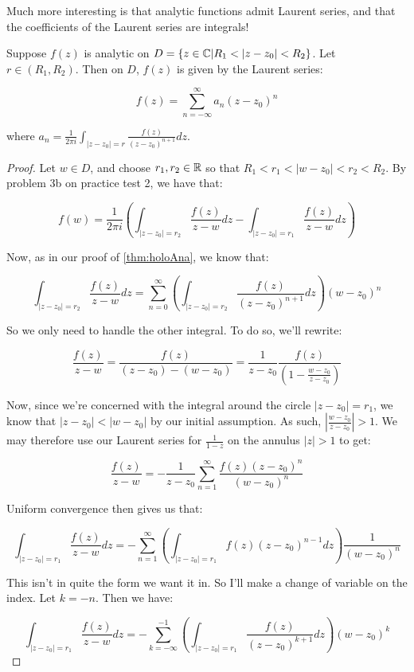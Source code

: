 Much more interesting is that analytic functions admit Laurent series, and that the coefficients of the Laurent series are integrals! 

\begin{thmbo}{}{} Suppose $f(z)$ is analytic on $D = \{z\in\mathbb{C}|R_1 < |z-z_0| < R_2\}$. Let $r\in (R_1,R_2)$. Then on $D$, $f(z)$ is given by the Laurent series:

$$f(z) = \sum_{n = -\infty}^\infty a_n(z-z_0)^n$$

\noin where $a_n = \frac{1}{2\pi i}\int_{|z-z_0|=r} \frac{f(z)}{(z-z_0)^{n+1}}dz$.
\end{thmbo}

\begin{proof} Let $w\in D$, and choose $r_1,r_2 \in \mathbb{R}$ so that $R_1 < r_1 < |w-z_0| < r_2 < R_2$. By problem 3b on practice test 2, we have that:

$$f(w) = \frac{1}{2\pi i}\left(\int_{|z-z_0| = r_2} \frac{f(z)}{z-w}dz - \int_{|z-z_0| = r_1} \frac{f(z)}{z-w}dz\right)$$

Now, as in our proof of \ref{thm:holoAna}, we know that:

$$\int_{|z-z_0| = r_2} \frac{f(z)}{z-w}dz = \sum_{n =0}^\infty \left(\int_{|z-z_0| = r_2} \frac{f(z)}{(z-z_0)^{n+1}}dz\right) (w-z_0)^n$$

So we only need to handle the other integral. To do so, we'll rewrite:

$$\frac{f(z)}{z-w} = \frac{f(z)}{(z-z_0) - (w-z_0)} = \frac{1}{z-z_0} \frac{f(z)}{\left(1 - \frac{w-z_0}{z-z_0}\right)}$$

Now, since we're concerned with the integral around the circle $|z-z_0| = r_1$, we know that $|z-z_0| < |w-z_0|$ by our initial assumption. As such, $\left|\frac{w-z_0}{z-z_0}\right| > 1$. We may therefore use our Laurent series for $\frac{1}{1-z}$ on the annulus $|z|> 1$ to get:

$$\frac{f(z)}{z-w} = -\frac{1}{z-z_0}\sum_{n = 1}^\infty \frac{f(z)(z-z_0)^n}{(w-z_0)^n}$$

Uniform convergence then gives us that:

$$\int_{|z-z_0| = r_1} \frac{f(z)}{z-w}dz = -\sum_{n = 1}^\infty \left(\int_{|z-z_0| = r_1} f(z)(z-z_0)^{n-1}dz\right)\frac{1}{(w-z_0)^n}$$

This isn't in quite the form we want it in. So I'll make a change of variable on the index. Let $k = -n$. Then we have:

$$\int_{|z-z_0| = r_1} \frac{f(z)}{z-w}dz =-\sum_{k = -\infty}^{-1} \left(\int_{|z-z_0| = r_1} \frac{f(z)}{(z-z_0)^{k+1}}dz\right)(w-z_0)^{k}$$


\end{proof}
